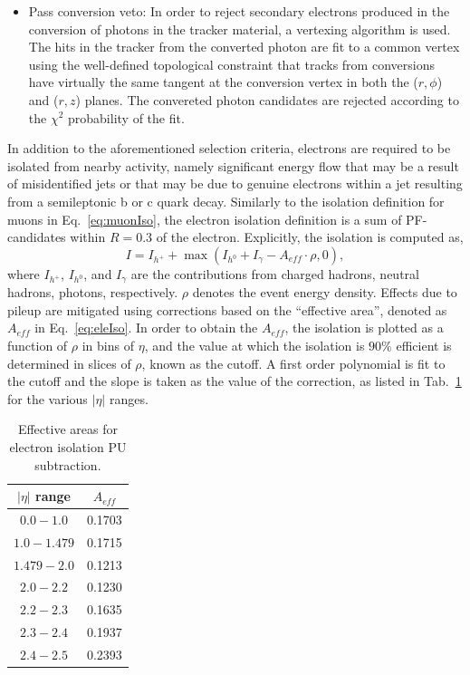 \begin{itemize}
\item Pass conversion veto: In order to reject secondary electrons produced in the conversion of photons in the tracker material, a vertexing algorithm is used. The hits in the tracker from the converted photon are fit to a common vertex using the well-defined topological constraint that tracks from conversions have virtually the same tangent at the conversion vertex in both the ($r,\phi$) and ($r,z$) planes. The convereted photon candidates are rejected according to the $\chi^2$ probability of the fit. 
\end{itemize}

In addition to the aforementioned selection criteria, electrons are required to be isolated from nearby activity, namely significant energy flow that may be a result of misidentified jets or that may be due to genuine electrons within a jet resulting from a semileptonic b or c quark decay. Similarly to the isolation definition for muons in Eq.~\ref{eq:muonIso}, the electron isolation definition is a sum of PF-candidates within $R=0.3$ of the electron. Explicitly, the isolation is computed as,
\begin{equation}
  I = I_{h^+} + \max\left(I_{h^0} + I_{\gamma} - A_{eff}\cdot\rho, 0\right),
  \label{eq:eleIso}
\end{equation}
where $I_{h^+}$, $I_{h^0}$, and $I_{\gamma}$ are the contributions from charged hadrons, neutral hadrons, photons, respectively. $\rho$ denotes the event energy density. Effects due to pileup are mitigated using corrections based on the ``effective area'', denoted as $A_{eff}$ in Eq.~\ref{eq:eleIso}. In order to obtain the $A_{eff}$, the isolation is plotted as a function of $\rho$ in bins of $\eta$, and the value at which the isolation is $90\%$ efficient is determined in slices of $\rho$, known as the cutoff. A first order polynomial is fit to the cutoff and the slope is taken as the value of the correction, as listed in Tab.~\ref{tab:ea} for the various $|\eta|$ ranges.

\begin{table}[!ht]
\centering
\begin{tabular}{|c|c|}
\hline
$|\eta|$ range     & $A_{eff}$ \\
\hline
$ 0.0 - 1.0$       & 0.1703 \\
$ 1.0 - 1.479$     & 0.1715 \\
$1.479 - 2.0$      & 0.1213 \\
$2.0 - 2.2$        & 0.1230 \\
$2.2 - 2.3$        & 0.1635 \\
$2.3 - 2.4$        & 0.1937 \\
$2.4 - 2.5$        & 0.2393 \\
\hline
\end{tabular}
\caption{Effective areas for electron isolation PU subtraction.}
\label{tab:ea}
\end{table}

